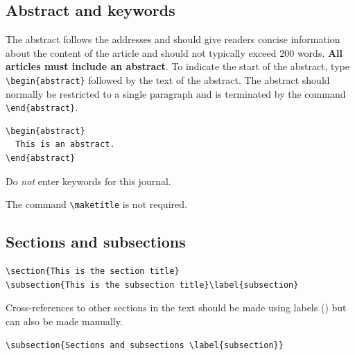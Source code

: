 \documentclass[a4paper]{jpconf}
\begin{document}
\subsection{Abstract and keywords}

The abstract follows the addresses and should give readers concise information about the content of the article and should not typically exceed 200 words. {\bf All articles must include an abstract}. To indicate the start of the abstract, type \verb"\begin{abstract}" followed by the text of the abstract. The abstract should normally be restricted 
to a single paragraph and is terminated by the command
\verb"\end{abstract}".

\begin{verbatim}
\begin{abstract}
  This is an abstract.
\end{abstract}
\end{verbatim}

Do \textit{not} enter keywords for this journal.

The command \verb"\maketitle" is not required.

\subsection{Sections and subsections}\label{subsection}

\begin{verbatim}
\section{This is the section title}
\subsection{This is the subsection title}\label{subsection}
\end{verbatim}

Cross-references to other sections in the text should be made using labels ()  but can also be made manually.

\begin{verbatim}
\subsection{Sections and subsections \label{subsection}}
\end{verbatim}
\end{document}
